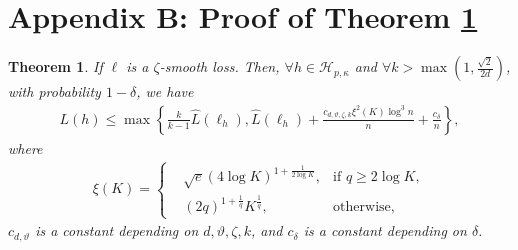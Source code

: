 \documentclass{article}
\newtheorem{theorem}{Theorem}
\begin{document}
\section{Appendix B: Proof of Theorem \ref{theorem-finally}}
\begin{theorem}
\label{theorem-finally}
  If $\ell$ is a $\zeta$-smooth loss.
  Then, $\forall h\in\mathcal{H}_{p,\kappa}$ and $\forall k>\max(1,\frac{\sqrt{2}}{2d})$,  with probability
  $1-\delta$, we have
  \begin{align*}
   L(h)\leq \max\left\{
        \frac{k}{k-1}\hat{L}(\ell_h),
       \hat{L}(\ell_h)+\frac{c_{d,\vartheta,\zeta, k}\xi^2(K) \log^3 n}{n}+\frac{c_{\delta}}{n}
     \right\},
\end{align*}
where \begin{align*}
  \xi(K)=
  \left\{
      \begin{aligned}
      &\sqrt{e}(4\log K)^{1+\frac{1}{2\log K}}, &\text{if } q\geq 2\log K,\\
      &(2q)^{1+\frac{1}{q}}K^{\frac{1}{q}}, &\text{otherwise},
      \end{aligned}
      \right.
  \end{align*}
  $c_{d,\vartheta}$ is a constant depending on $d,\vartheta,\zeta, k$,
  and $c_{\delta}$ is a constant depending on $\delta$.
\end{theorem}
\end{document}

